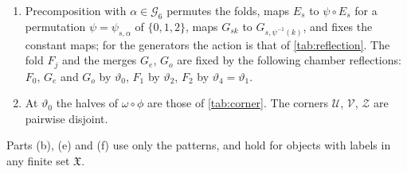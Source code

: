 \begin{lemma}
\begin{enumerate}[label=\textup{(\alph*)}]
 $\iota$; the actual half marginal of the first is $\Pi_{F_j}(m_0)$, where
 $m_0$ is the law of the layer-zero triple under $\lambda_{\rm F}$, that of the second the
 uniform law on the ordered triples of labels distinct at every prime of
 $\Blk$, placed by $E_s$.
\item Precomposition with $\alpha\in\mathcal G_6$ permutes the folds, maps
 $E_s$ to $\psi\circ E_s$ for a permutation $\psi=\psi_{s,\alpha}$ of
 $\{0,1,2\}$, maps $G_{sk}$ to $G_{s,\psi^{-1}(k)}$, and fixes the constant
 maps; for the generators the action is that of \cref{tab:reflection}. The
 fold $F_j$ and the merges $G_e$, $G_o$ are fixed by the following
 chamber reflections: $F_0$, $G_e$ and $G_o$ by $\vartheta_0$, $F_1$ by $\vartheta_2$,
 $F_2$ by $\vartheta_4=\vartheta_1$.
\item At $\vartheta_0$ the halves of $\omega\circ\phi$ are those of
 \cref{tab:corner}. The corners $\mathcal U$, $\mathcal V$, $\mathcal Z$ are
 pairwise disjoint.
\end{enumerate}
Parts (b), (e) and (f) use only the patterns, and hold for objects with labels
in any finite set $\mathfrak X$.
\end{lemma}

